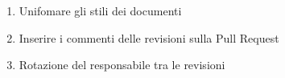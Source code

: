 \begin{enumerate}
    \item Unifomare gli stili dei documenti
    \item Inserire i commenti delle revisioni sulla Pull Request
    \item Rotazione del responsabile tra le revisioni
\end{enumerate}